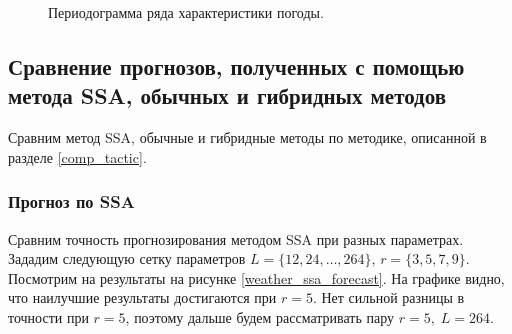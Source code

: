 \documentclass[specialist,
               substylefile = spbu.rtx,
               subf,href,colorlinks=true, 12p]{disser}
\begin{document}
\begin{figure}[H]
	\caption{Периодограмма ряда характеристики погоды.}
	\label{weather_pgram}
\end{figure}

\subsection{Сравнение прогнозов, полученных с помощью метода SSA, обычных и гибридных методов}

Сравним метод SSA, обычные и гибридные методы по методике, описанной в разделе \ref{comp_tactic}.

\subsubsection{Прогноз по SSA}

Сравним точность прогнозирования методом SSA при разных параметрах. Зададим следующую сетку параметров $L = \{12, 24, \ldots, 264\}$, $r = \{3, 5, 7, 9\}$. Посмотрим на результаты на рисунке \ref{weather_ssa_forecast}. На графике видно, что наилучшие результаты достигаются при $r = 5$. Нет сильной разницы в точности при $r=5$, поэтому дальше будем рассматривать пару $r = 5, \; L = 264$.
\end{document}
